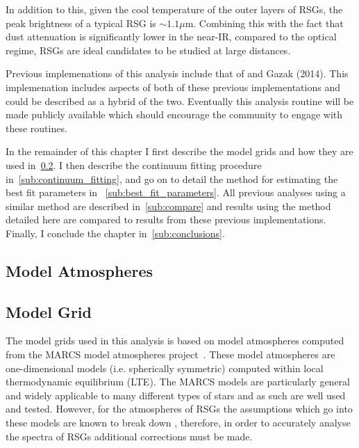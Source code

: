In addition to this, given the cool temperature of the outer layers of RSGs,
the peak brightness of a typical RSG is $\sim1.1\mu$m.
Combining this with the fact that dust attenuation is significantly lower in the near-IR, compared to the optical regime, RSGs are ideal candidates to be studied at large distances.

Previous implemenations of this analysis include that of
\cite{2010MNRAS.407.1203D} and Gazak (2014).
This implemenation includes aspects of both of these previous implementations and could be described as a hybrid of the two.
Eventually this analysis routine will be made publicly available which should encourage the community to engage with these routines.

In the remainder of this chapter I first describe the model grids and how they are used in~\ref{sub:model_grid}.
I then describe the continuum fitting procedure in~\ref{sub:continuum_fitting},
and go on to detail the method for estimating the best fit parameters in
~\ref{sub:best_fit_parameters}.
All previous analyses using a similar method are described in~\ref{sub:compare}
and results using the method detailed here are compared to results from these previous implementations.
Finally, I conclude the chapter in~\ref{sub:conclusions}.

\subsection{Model Atmospheres} %
\label{sub:model_atmospheres}


\subsection{Model Grid} %
\label{sub:model_grid}
The model grids used in this analysis is based on model atmospheres computed from the
MARCS model atmospheres project~\citep{2008A&A...486..951G}.
These model atmospheres are one-dimensional models (i.e. spherically symmetric)
computed within local thermodynamic equilibrium (LTE).
The MARCS models are particularly general and widely applicable to many different types of stars and as such are well used and tested.
However, for the atmospheres of RSGs the assumptions which go into these models are known to break down
\citep{2002AN....323..213F,2010ASPC..425..124P},
therefore, in order to accurately analyse the spectra of RSGs additional corrections must be made.


